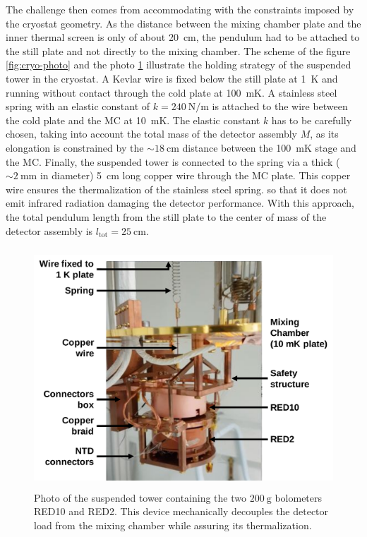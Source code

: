 The challenge then comes from accommodating with the constraints imposed by the cryostat geometry. As the distance between the mixing chamber plate and the inner thermal screen is only of about \SI{20}{\cm}, the pendulum had to be attached to the still plate and not directly to the mixing chamber.
The scheme of the figure \ref{fig:cryo-photo} and the photo \ref{fig:suspended-tower} illustrate the holding strategy of the suspended tower in the cryostat. 
A Kevlar wire is fixed below the still plate at \SI{1}{\kelvin} and running without contact through the cold plate at \SI{100}{\milli\kelvin}. 
A stainless steel spring with an elastic constant of $k=\SI{240}{\newton\per\meter}$ is attached to the wire between the cold plate and the MC at \SI{10}{\milli\kelvin}. The elastic constant $k$ has to be carefully chosen, taking into account the total mass of the detector assembly $M$, as its elongation is constrained by the $\sim \SI{18}{\cm}$ distance between the \SI{100}{\milli\kelvin} stage and the MC. 
Finally, the suspended tower is connected to the spring via a thick ($\sim \SI{2}{\mm}$ in diameter) \SI{5}{\cm} long copper wire through the MC plate. This copper wire ensures the thermalization of the stainless steel spring. so that it does not emit infrared radiation damaging the detector performance.
With this approach, the total pendulum length from the still plate to the center of mass of the detector assembly is $l_{\textrm{tot}} = \SI{25}{\cm}$.


\begin{figure}
\centering
\captionsetup{justification=centering}
\includegraphics[height=9cm]{graphics/damocles.png}
\caption{Photo of the suspended tower containing the two $\SI{200}{\g}$ bolometers RED10 and RED2. This device mechanically decouples the detector load from the mixing chamber while assuring its thermalization.}
\label{fig:suspended-tower} 
\end{figure}

